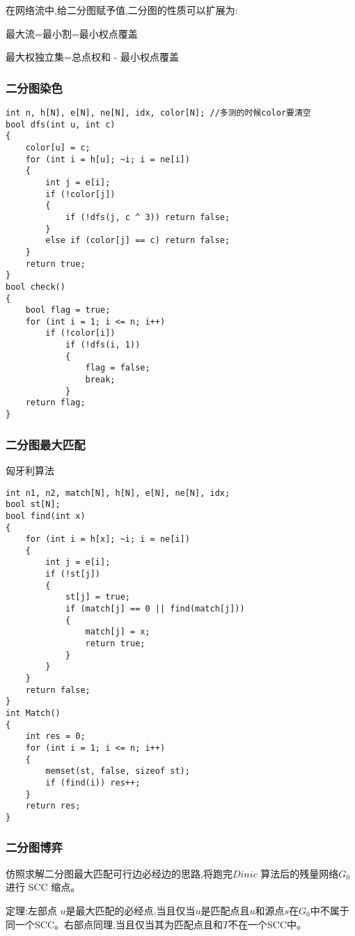 \documentclass[a4paper,fontset=none]{ctexart}
\begin{document}
在网络流中,给二分图赋予值,二分图的性质可以扩展为:

最大流=最小割=最小权点覆盖

最大权独立集=总点权和 - 最小权点覆盖
\subsubsection{二分图染色}

\begin{verbatim}
int n, h[N], e[N], ne[N], idx, color[N]; //多测的时候color要清空
bool dfs(int u, int c)
{
    color[u] = c;
    for (int i = h[u]; ~i; i = ne[i])
    {
        int j = e[i];
        if (!color[j])
        {
            if (!dfs(j, c ^ 3)) return false;
        }
        else if (color[j] == c) return false;
    }
    return true;
}
bool check()
{
    bool flag = true;
    for (int i = 1; i <= n; i++)
        if (!color[i])
            if (!dfs(i, 1))
            {
                flag = false;
                break;
            }
    return flag;
}
\end{verbatim}
\subsubsection{二分图最大匹配}

匈牙利算法

\begin{verbatim}
int n1, n2, match[N], h[N], e[N], ne[N], idx;
bool st[N];
bool find(int x)
{
    for (int i = h[x]; ~i; i = ne[i])
    {
        int j = e[i];
        if (!st[j])
        {
            st[j] = true;
            if (match[j] == 0 || find(match[j]))
            {
                match[j] = x;
                return true;
            }
        }
    }
    return false;
}
int Match()
{
    int res = 0;
    for (int i = 1; i <= n; i++)
    {
        memset(st, false, sizeof st);
        if (find(i)) res++;
    }
    return res;
}
\end{verbatim}
\subsubsection{二分图博弈}

仿照求解二分图最大匹配可行边必经边的思路,将跑完$Dinic$ 算法后的残量网络$G_0$进行 SCC 缩点。

定理:左部点 $u$是最大匹配的必经点,当且仅当$u$是匹配点且$u$和源点$s$在$G_0$中不属于同一个SCC。右部点同理,当且仅当其为匹配点且和$T$不在一个SCC中。
\end{document}
